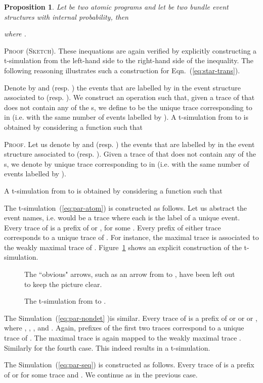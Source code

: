 \documentclass[review]{elsart}
\newtheorem{proposition}[definition]{Proposition}
\newenvironment{proof}{\par
\noindent
\textsc{Proof. }
\noindent}{\hfill}
\newenvironment{proofsummary}{\par
\noindent
\textsc{Proof (Sketch). }
\noindent}{\hfill}
\newcommand{\Eqn}[1]{Eqn.~(\ref{#1})}
\begin{document}
\begin{proposition}\label{pro:get-rid-of-par}
Let  be two atomic programs and let  be two bundle event structures with internal probability, then 

where .
\end{proposition}

\begin{proofsummary}
  These inequations are again verified by explicitly constructing a t-simulation from the left-hand side to the right-hand side of the inequality. The following reasoning illustrates such a construction for \Eqn{eq:star-trans}.

  Denote by  and  (resp. ) the events that are labelled by  in the event structure associated to  (resp. ). We construct an operation  such that, given a trace  of  that does not contain any of the s, we define  to be the unique trace corresponding to  in  (i.e. with the same number of events labelled by ). A t-simulation from  to  is obtained by considering a function  such that  \end{proofsummary}

\begin{proof}
Let us denote by  and  (resp. ) the events that are labelled by  in the event structure associated to  (resp. ). Given a trace  of  that does not contain any of the s, we denote by  unique trace corresponding to  in  (i.e. with the same number of events labelled by ). 

A t-simulation from  to  is obtained by considering a function  such that 


The t-simulation~(\ref{eq:par-atom}) is constructed as follows. Let us abstract the event names, i.e.  would be a trace where each  is the label of a unique event. Every trace of  is a prefix of  or , for some . Every prefix of either trace corresponds to a unique trace of . For instance, the maximal trace  is associated to the weakly maximal trace  of . Figure~\ref{fig:messy-simulation} shows an explicit construction of the t-simulation.
\begin{figure}
\begin{small}

\end{small}
The ``obvious" arrows, such as an arrow from  to , have been left out to keep the picture clear.
\caption{The t-simulation from  to .}\label{fig:messy-simulation}
\end{figure}

The Simulation~(\ref{eq:par-nondet} )is similar. Every trace of  is a prefix of  or  or  or , where , , ,  and . Again, prefixes of the first two traces correspond to a unique trace of . The maximal trace  is again mapped to the weakly maximal trace . Similarly for the fourth case. This indeed results in a t-simulation.

The Simulation~(\ref{eq:par-seq}) is constructed as follows. Every trace of  is a prefix of  or  for some trace  and . We continue as in the previous case.
\end{proof}
\end{document}
